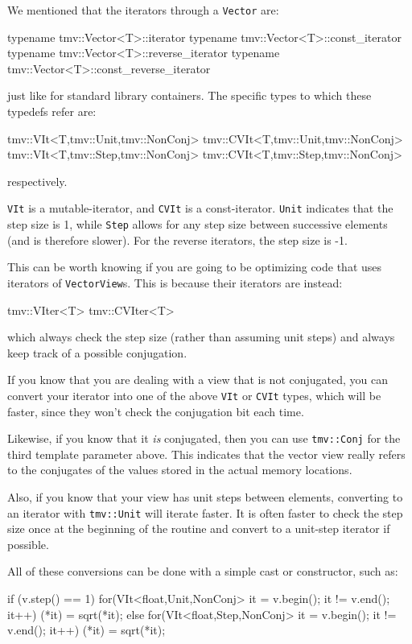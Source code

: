 \documentclass[twoside,letterpaper,11pt]{article}
\renewcommand{\tt}[1]{{\lstinline {#1}}}
\begin{document}
We mentioned that the iterators through a \tt{Vector} are:
\begin{tmvcode}
typename tmv::Vector<T>::iterator
typename tmv::Vector<T>::const_iterator
typename tmv::Vector<T>::reverse_iterator
typename tmv::Vector<T>::const_reverse_iterator
\end{tmvcode}
just like for standard library containers.  The specific types to which these
typedefs refer are:
\begin{tmvcode}
tmv::VIt<T,tmv::Unit,tmv::NonConj>
tmv::CVIt<T,tmv::Unit,tmv::NonConj>
tmv::VIt<T,tmv::Step,tmv::NonConj>
tmv::CVIt<T,tmv::Step,tmv::NonConj>
\end{tmvcode}
respectively.

\tt{VIt} is a mutable-iterator, and \tt{CVIt} is a const-iterator.  \tt{Unit} 
indicates that the step size is 1, while \tt{Step} allows for any step size
between successive elements (and is therefore slower).  For the reverse
iterators, the step size is -1.

This can be worth knowing if you are going to be optimizing code that uses
iterators of \tt{VectorView}s.
This is because their iterators are instead:
\begin{tmvcode}
tmv::VIter<T>
tmv::CVIter<T>
\end{tmvcode}
which always check the step size (rather than assuming unit steps) and always
keep track of a possible conjugation.

If you know that you are dealing with a view that is not conjugated, you can 
convert your iterator into one of the above \tt{VIt} or \tt{CVIt} types, which will be 
faster, since they won't check the conjugation bit each time. 

Likewise, if you
know that it {\em is} conjugated, then you can use \tt{tmv::Conj} for the 
third template parameter above.  This indicates that the vector view really
refers to the conjugates of the values stored in the actual memory locations.

Also, if you know that your view has unit steps between elements, converting to 
an iterator with \tt{tmv::Unit} will iterate faster.  It is often faster to check
the step size once at the beginning of the routine and convert to a unit-step
iterator if possible.

All of these conversions can be done with a simple cast or constructor, such as:
\begin{tmvcode}
if (v.step() == 1) {
    for(VIt<float,Unit,NonConj> it = v.begin(); it != v.end(); it++)
        (*it) = sqrt(*it);
} else {
    for(VIt<float,Step,NonConj> it = v.begin(); it != v.end(); it++)
        (*it) = sqrt(*it);
}
\end{tmvcode}
\end{document}
